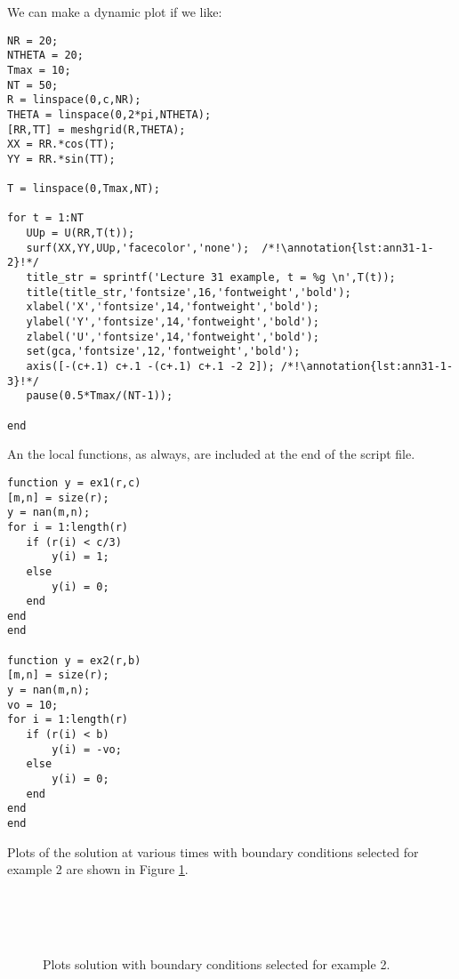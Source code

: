 \noindent We can make a dynamic plot if we like:
\begin{lstlisting}[name=lec31-ex1, style=myMatlab]
%% Plot the solution
NR = 20;
NTHETA = 20;
Tmax = 10;
NT = 50;
R = linspace(0,c,NR);
THETA = linspace(0,2*pi,NTHETA);
[RR,TT] = meshgrid(R,THETA);
XX = RR.*cos(TT);
YY = RR.*sin(TT);

T = linspace(0,Tmax,NT);

for t = 1:NT
   UUp = U(RR,T(t));
   surf(XX,YY,UUp,'facecolor','none');  /*!\annotation{lst:ann31-1-2}!*/
   title_str = sprintf('Lecture 31 example, t = %g \n',T(t));
   title(title_str,'fontsize',16,'fontweight','bold');
   xlabel('X','fontsize',14,'fontweight','bold');
   ylabel('Y','fontsize',14,'fontweight','bold');
   zlabel('U','fontsize',14,'fontweight','bold');
   set(gca,'fontsize',12,'fontweight','bold');
   axis([-(c+.1) c+.1 -(c+.1) c+.1 -2 2]); /*!\annotation{lst:ann31-1-3}!*/
   pause(0.5*Tmax/(NT-1));  
    
end
\end{lstlisting}

\vspace{0.25cm}

\noindent An the local functions, as always, are included at the end of the script file.

\begin{lstlisting}[name=lec31-ex1,style=myMatlab]
%% Local functions
function y = ex1(r,c)
[m,n] = size(r);
y = nan(m,n);
for i = 1:length(r)
   if (r(i) < c/3)
       y(i) = 1;
   else
       y(i) = 0;
   end    
end
end

function y = ex2(r,b)
[m,n] = size(r);
y = nan(m,n);
vo = 10;
for i = 1:length(r)
   if (r(i) < b)
       y(i) = -vo;
   else
       y(i) = 0;
   end    
end
end
\end{lstlisting}
Plots of the solution at various times with boundary conditions selected for example 2 are shown in Figure \ref{fig:lec31-ex1-plots}.
\begin{figure}[h!]
 \\
 \\
 \\
\label{fig:lec31-ex1-plots}
\caption{Plots solution with boundary conditions selected for example 2.}
\end{figure}

